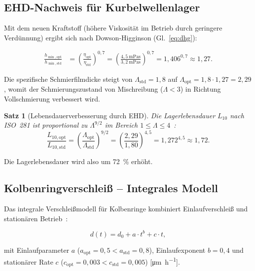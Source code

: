 ﻿\documentclass[12pt,a4paper]{article}
\newtheorem{theorem}{Satz}[section]
\begin{document}
\subsection{EHD-Nachweis für Kurbelwellenlager}
\label{sec:tribologie_ehd}

Mit dem neuen Kraftstoff (höhere Viskosität im Betrieb durch geringere
Verdünnung) ergibt sich nach Dowson-Higginson (Gl.~\eqref{eq:dhg}):

\begin{align}
  \frac{h_{\min,\mathrm{opt}}}{h_{\min,\mathrm{std}}}
  &= \left(\frac{\eta_{\mathrm{opt}}}{\eta_{\mathrm{std}}}\right)^{0{,}7}
   = \left(\frac{4{,}5\ \si{\milli\Pa\s}}{3{,}2\ \si{\milli\Pa\s}}\right)^{0{,}7}
   = 1{,}406^{0{,}7} \approx 1{,}27.
\end{align}

Die spezifische Schmierfilmdicke steigt von $\Lambda_{\mathrm{std}} = 1{,}8$
auf $\Lambda_{\mathrm{opt}} = 1{,}8 \cdot 1{,}27 = 2{,}29$, womit der
Schmierungszustand von Mischreibung ($\Lambda < 3$) in Richtung
Vollschmierung verbessert wird.

\begin{theorem}[Lebensdauerverbesserung durch EHD]
\label{thm:ehd_lebensdauer}
Die Lagerlebensdauer $L_{10}$ nach ISO~281 ist proportional zu
$\Lambda^{9/2}$ im Bereich $1 \leq \Lambda \leq 4$~\cite{ioannides1999}:
\begin{equation}
  \frac{L_{10,\mathrm{opt}}}{L_{10,\mathrm{std}}}
  = \left(\frac{\Lambda_{\mathrm{opt}}}{\Lambda_{\mathrm{std}}}\right)^{9/2}
  = \left(\frac{2{,}29}{1{,}80}\right)^{4{,}5}
  = 1{,}272^{4{,}5} \approx 1{,}72.
\end{equation}
\end{theorem}

Die Lagerlebensdauer wird also um \SI{72}{\percent} erhöht.

\subsection{Kolbenringverschlei\ss{} -- Integrales Modell}
\label{sec:tribologie_kolben}

Das integrale Verschlei\ss{}modell für Kolbenringe kombiniert
Einlaufverschlei\ss{} und stationären Betrieb~\cite{taylor1998}:

\begin{equation}
  d(t) = d_0 + a \cdot t^b + c \cdot t,
  \label{eq:kolbenring_verschleiss}
\end{equation}

mit Einlaufparameter $a$ ($a_{\mathrm{opt}} = 0{,}5 < a_{\mathrm{std}} = 0{,}8$),
Einlaufexponent $b = 0{,}4$ und stationärer Rate $c$
($c_{\mathrm{opt}} = 0{,}003 < c_{\mathrm{std}} = 0{,}005$)
[\si{\micro\m\per\hour}].
\end{document}
